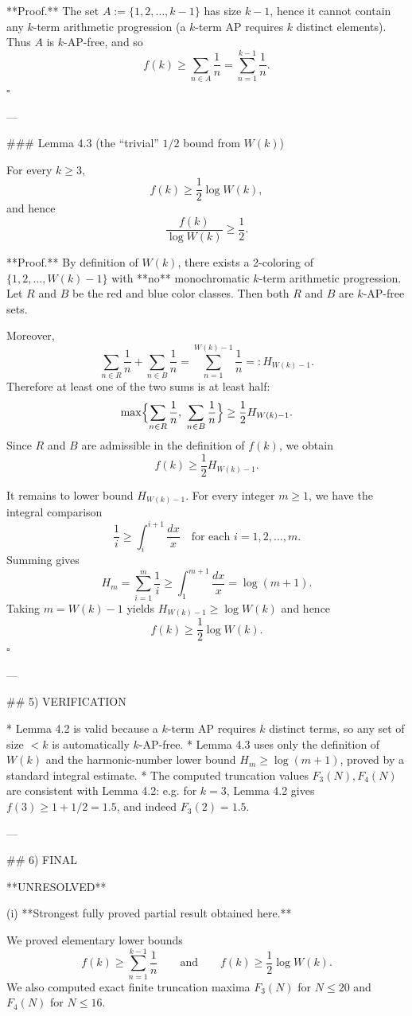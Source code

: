 **Proof.**
The set $A:=\{1,2,\dots,k-1\}$ has size $k-1$, hence it cannot contain any $k$-term arithmetic progression (a $k$-term AP requires $k$ distinct elements). Thus $A$ is $k$-AP-free, and so
\[
f(k)\ge \sum_{n\in A}\frac1n=\sum_{n=1}^{k-1}\frac1n.
\]
$\square$

---

### Lemma 4.3 (the “trivial” $1/2$ bound from $W(k)$)

For every $k\ge 3$,
\[
f(k)\ge \frac12\log W(k),
\]
and hence
\[
\frac{f(k)}{\log W(k)}\ge \frac12.
\]

**Proof.**
By definition of $W(k)$, there exists a 2-coloring of $\{1,2,\dots,W(k)-1\}$ with **no** monochromatic $k$-term arithmetic progression.
Let $R$ and $B$ be the red and blue color classes. Then both $R$ and $B$ are $k$-AP-free sets.

Moreover,
\[
\sum_{n\in R}\frac1n+\sum_{n\in B}\frac1n=\sum_{n=1}^{W(k)-1}\frac1n=:H_{W(k)-1}.
\]
Therefore at least one of the two sums is at least half:
\[
\max\Bigl\{\sum_{n\in R}\frac1n,\ \sum_{n\in B}\frac1n\Bigr\}\ge \frac12 H_{W(k)-1}.
\]
Since $R$ and $B$ are admissible in the definition of $f(k)$, we obtain
\[
f(k)\ge \frac12 H_{W(k)-1}.
\]

It remains to lower bound $H_{W(k)-1}$.
For every integer $m\ge 1$, we have the integral comparison
\[
\frac1i \ge \int_{i}^{i+1}\frac{dx}{x}
\quad\text{for each }i=1,2,\dots,m.
\]
Summing gives
\[
H_m=\sum_{i=1}^m\frac1i \ge \int_{1}^{m+1}\frac{dx}{x}=\log(m+1).
\]
Taking $m=W(k)-1$ yields $H_{W(k)-1}\ge \log W(k)$ and hence
\[
f(k)\ge \frac12\log W(k).
\]
$\square$

---

## 5) VERIFICATION

* Lemma 4.2 is valid because a $k$-term AP requires $k$ distinct terms, so any set of size $<k$ is automatically $k$-AP-free.
* Lemma 4.3 uses only the definition of $W(k)$ and the harmonic-number lower bound $H_m\ge\log(m+1)$, proved by a standard integral estimate.
* The computed truncation values $F_3(N),F_4(N)$ are consistent with Lemma 4.2: e.g. for $k=3$, Lemma 4.2 gives $f(3)\ge 1+1/2=1.5$, and indeed $F_3(2)=1.5$.

---

## 6) FINAL

**UNRESOLVED**

(i) **Strongest fully proved partial result obtained here.**

We proved elementary lower bounds
\[
f(k)\ge \sum_{n=1}^{k-1}\frac1n\qquad\text{and}\qquad f(k)\ge \frac12\log W(k).
\]
We also computed exact finite truncation maxima $F_3(N)$ for $N\le 20$ and $F_4(N)$ for $N\le 16$.

